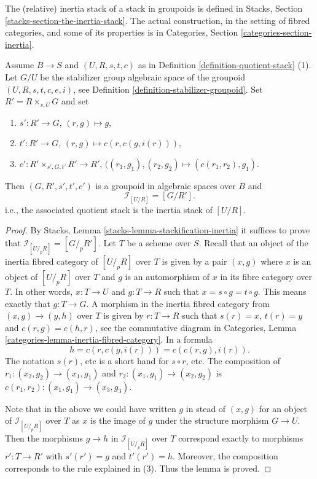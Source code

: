 \noindent
The (relative) inertia stack of a stack in groupoids is defined in
Stacks, Section \ref{stacks-section-the-inertia-stack}.
The actual construction, in the setting of fibred categories, and some
of its properties is in
Categories, Section \ref{categories-section-inertia}.

\begin{lemma}
\label{lemma-presentation-inertia}
Assume $B \to S$ and $(U, R, s, t, c)$ as in
Definition \ref{definition-quotient-stack} (1).
Let $G/U$ be the stabilizer group algebraic space of the groupoid
$(U, R, s, t, c, e, i)$, see
Definition \ref{definition-stabilizer-groupoid}.
Set $R' = R \times_{s, U} G$ and set
\begin{enumerate}
\item $s' : R' \to G$, $(r, g) \mapsto g$,
\item $t' : R' \to G$, $(r, g) \mapsto c(r, c(g, i(r)))$,
\item $c' : R' \times_{s', G, t'} R' \to R'$,
$((r_1, g_1), (r_2, g_2) \mapsto (c(r_1, r_2), g_1)$.
\end{enumerate}
Then $(G, R', s', t', c')$ is a groupoid in algebraic spaces over $B$
and
$$
\mathcal{I}_{[U/R]} = [G/ R'].
$$
i.e., the associated quotient stack is the inertia stack of $[U/R]$.
\end{lemma}

\begin{proof}
By
Stacks, Lemma \ref{stacks-lemma-stackification-inertia}
it suffices to prove that $\mathcal{I}_{[U/_{\!p}R]} = [G/_{\!p} R']$.
Let $T$ be a scheme over $S$. Recall that an object of the inertia fibred
category of $[U/_{\!p}R]$ over $T$ is given by a pair
$(x, g)$ where $x$ is an object of $[U/_{\!\!p}R]$ over $T$
and $g$ is an automorphism of $x$ in its fibre category over $T$.
In other words, $x : T \to U$ and $g : T \to R$ such that
$x = s \circ g = t \circ g$. This means exactly that
$g : T \to G$. A morphism in the inertia fibred category
from $(x, g) \to (y, h)$ over $T$ is given by
$r : T \to R$ such that $s(r) = x$, $t(r) = y$
and $c(r, g) = c(h, r)$, see the commutative diagram in
Categories, Lemma \ref{categories-lemma-inertia-fibred-category}.
In a formula
$$
h = c(r, c(g, i(r))) = c(c(r, g), i(r)).
$$
The notation $s(r)$, etc is a short hand for $s \circ r$, etc.
The composition of $r_1 : (x_2, g_2) \to (x_1, g_1)$
and $r_2 : (x_1, g_1) \to (x_2, g_2)$ is
$c(r_1, r_2) : (x_1, g_1) \to (x_3, g_3)$.

\medskip\noindent
Note that in the above we could have written $g$ in stead of $(x, g)$
for an object of $\mathcal{I}_{[U/_{\!p}R]}$ over $T$ as $x$ is the
image of $g$ under the structure morphism $G \to U$. Then the morphisms
$g \to h$ in $\mathcal{I}_{[U/_{\!p}R]}$ over $T$ correspond exactly
to morphisms $r' : T \to R'$ with $s'(r') = g$ and $t'(r') = h$.
Moreover, the composition corresponds to the rule explained in (3).
Thus the lemma is proved.
\end{proof}

